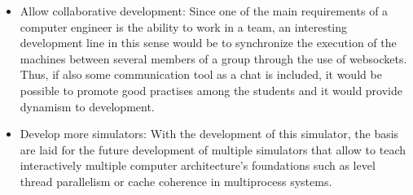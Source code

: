 \begin{itemize}
\item Allow collaborative development: Since one of the main requirements of a
computer engineer is the ability to work in a team, an interesting development line
in this sense would be to synchronize the execution of the machines between several members of a group
through the use of websockets. Thus, if also some communication tool as a chat is included,
it would be possible to promote good practises among the students and it would provide 
dynamism to development.

\item Develop more simulators: With the development of this simulator, the basis are laid for
the future development of multiple simulators that allow to teach interactively multiple computer architecture's foundations
such as level thread parallelism or cache coherence in multiprocess systems.

\end{itemize}